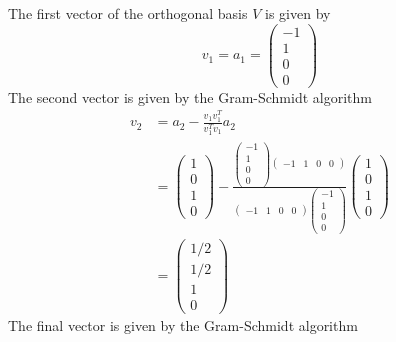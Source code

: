 \documentclass{article}
\begin{document}
The first vector of the orthogonal basis $V$ is given by
$$ v_1 = a_1 = \begin{pmatrix}
    -1 \\
    1 \\
    0 \\
    0
\end{pmatrix} $$
The second vector is given by the Gram-Schmidt algorithm
\begin{align*}
    v_2 &= a_2 - \frac{v_1 v_1^T}{v_1^T v_1} a_2 \\
    &= \begin{pmatrix} 1 \\ 0 \\ 1 \\ 0 \end{pmatrix} - \frac{\begin{pmatrix}
    -1 \\ 1 \\ 0 \\ 0 \end{pmatrix} \begin{pmatrix} -1 & 1 & 0 & 0
    \end{pmatrix}}{\begin{pmatrix} -1 & 1 & 0 & 0 \end{pmatrix}
    \begin{pmatrix} -1 \\ 1 \\ 0 \\ 0 \end{pmatrix}} \begin{pmatrix} 1 \\ 0
    \\ 1 \\ 0 \end{pmatrix} \\
    &= \begin{pmatrix} 1/2 \\ 1/2 \\ 1 \\ 0 \end{pmatrix}
\end{align*}
The final vector is given by the Gram-Schmidt algorithm
\end{document}
